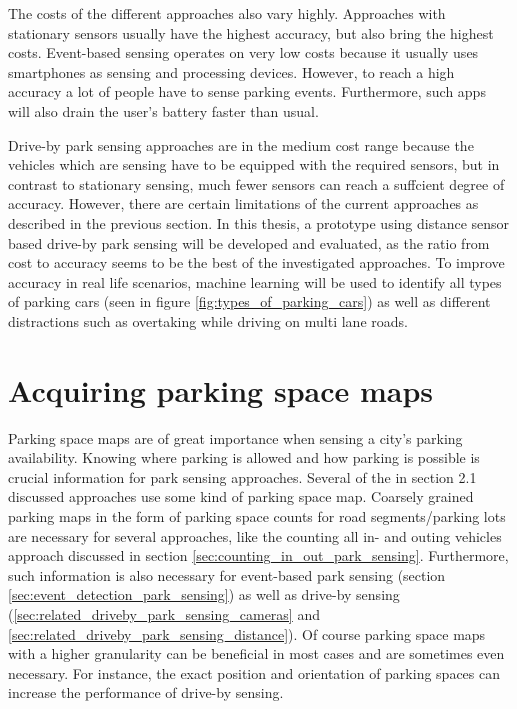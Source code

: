 The costs of the different approaches also vary highly. Approaches with stationary sensors usually have the highest accuracy, but also bring the highest costs. Event-based sensing operates on very low costs because it usually uses smartphones as sensing and processing devices. However, to reach a high accuracy a lot of people have to sense parking events. Furthermore, such apps will also drain the user's battery faster than usual.

Drive-by park sensing approaches are in the medium cost range because the vehicles which are sensing have to be equipped with the required sensors, but in contrast to stationary sensing, much fewer sensors can reach a suffcient degree of accuracy. However, there are certain limitations of the current approaches as described in the previous section. In this thesis, a prototype using distance sensor based drive-by park sensing will be developed and evaluated, as the ratio from cost to accuracy seems to be the best of the investigated approaches. To improve accuracy in real life scenarios, machine learning will be used to identify all types of parking cars (seen in figure \ref{fig:types_of_parking_cars}) as well as different distractions such as overtaking while driving on multi lane roads.







\section{Acquiring parking space maps}
\label{sec:acquiring_parking_space_maps}

Parking space maps are of great importance when sensing a city's parking availability. Knowing where parking is allowed and how parking is possible is crucial information for park sensing approaches. Several of the in section 2.1 discussed approaches use some kind of parking space map. Coarsely grained parking maps in the form of parking space counts for road segments/parking lots are necessary for several approaches, like the counting all in- and outing vehicles approach discussed in section \ref{sec:counting_in_out_park_sensing}. Furthermore, such information is also necessary for event-based park sensing (section \ref{sec:event_detection_park_sensing}) as well as drive-by sensing (\ref{sec:related_driveby_park_sensing_cameras} and \ref{sec:related_driveby_park_sensing_distance}). Of course parking space maps with a higher granularity can be beneficial in most cases and are sometimes even necessary. For instance, the exact position and orientation of parking spaces can increase the performance of drive-by sensing.

